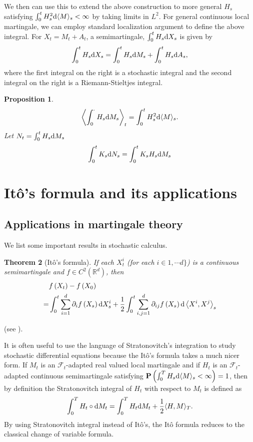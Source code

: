 \documentclass[twoside, 12pt]{book}
\numberwithin{equation}{chapter}
\newtheorem{theorem}{Theorem}[section]
\newtheorem{proposition}[theorem]{Proposition}
\def\cF{{\mathcal F}}
\def\mR{{\mathbb R}}
\def\bP{{\mathbf P}}
\def\l{\left}
\def\r{\right}
\def\<{\langle}
\def\>{\rangle}
\def\d{\text{\rm{d}}}
\begin{document}
	We then can use this to extend the above construction to more general $H_s$ satisfying $\int_0^t H_s^2 \d \langle M \rangle_s<\infty$ by taking limits in $L^2$. For general continuous local martingale, we can employ standard localization argument to define the above integral. For $X_t=M_t+A_t$, a semimartingale, $\int_0^t H_s \d X_s$ is given by
	$$
	\int_0^t H_s \d X_s=\int_0^t H_s \d M_s+\int_0^t H_s \d A_s, 
	$$
	where the first integral on the right is a stochastic integral and the second integral on the right is a Riemann-Stieltjes integral.
	
	\begin{proposition}
		\begin{equation*}
			\l\<\int_0^\cdot H_s \d M_s\r\>_t= \int_0^t H_s^2 \d \<M\>_s. 
		\end{equation*}
		Let $N_t=\int_0^t H_s\d M_s$
		\begin{equation*}
			\int_0^t K_s\d N_s=\int_0^t K_s H_s \d M_s
		\end{equation*}
	\end{proposition}
	
	\section{It\^o's formula and its applications}
	
	\subsection{Applications in martingale theory}
	We list some important results in stochastic calculus. 
	\begin{theorem}[It\^o's formula]
		If each $X_t^i$ (for each $i\in 1,\cdots d\}$) is a continuous semimartingale and $f\in C^2(\mR^d)$, then \begin{equation}\label{eq:Ito}
			\begin{aligned}
				&f\left(X_t\right)  -f\left(X_0\right) \\
				= & \int_0^t \sum_{i=1}^d \partial_i f\left(X_s\right) \d X_s^i+\frac{1}{2} \int_0^t \sum_{i, j=1}^d \partial_{i j} f\left(X_s\right) \d\left\langle X^i, X^j\right\rangle_s
			\end{aligned}
		\end{equation}
	\end{theorem}
	(see \cite[Theorem 13.5]{Huang}). 

 It is often useful to use the language of Stratonovitch's integration to study stochastic differential equations because the Itô’s formula takes a much nicer form. If $M_t$ is an $\cF_t$-adapted real valued local martingale and if $H_t$ is an $\cF_t$-adapted continuous semimartingale satisfying $\bP\left(\int_0^TH_s\d \<M\>_s<\infty\right)=1$, then by definition the Stratonovitch integral of  $H_t$ with respect to $M_t$ is defined as
\[
    \int_0^T H_t \circ \d  M_t =\int_0^T H_t\d M_t+\frac{1}{2} \langle H, M \rangle_T. 
\]
By using Stratonovitch integral instead of Itô’s, the Itô formula reduces to the classical change of variable formula.
\end{document}
